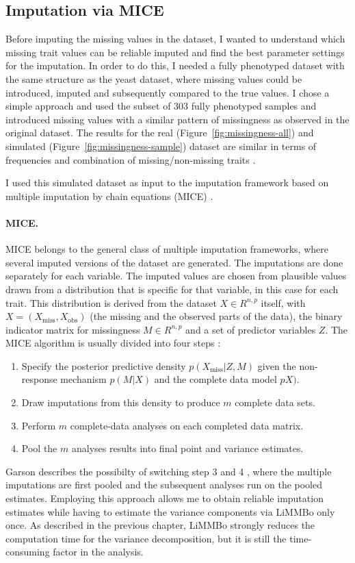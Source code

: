 \subsection{Imputation via MICE} 
Before imputing the missing values in the dataset, I wanted to understand which missing trait values can be reliable imputed and find the best parameter settings for the imputation. In order to do this, I needed a fully phenotyped dataset with the same structure as the yeast dataset, where missing values could be introduced, imputed and subsequently compared to the true values. I chose a simple approach and used the subset of 303 fully phenotyped samples and introduced missing values with a similar pattern of missingness as observed in the original dataset. The results for the real (Figure~\ref{fig:missingness-all}) and simulated (Figure~\ref{fig:missingness-sample}) dataset are similar in terms of frequencies and combination of missing/non-missing traits .

I used this simulated dataset as input to the imputation framework based on multiple imputation by chain equations (MICE) \citep{vanBuuren2011}. 
\paragraph{MICE.} MICE belongs to the general class of multiple imputation frameworks, where several imputed versions of the dataset are generated. The imputations are done separately for each variable. The imputed values are chosen from plausible values drawn from a distribution that is specific for that variable, in this case for each trait. This distribution is derived from the dataset \(X \in R^{n,p}\) itself,  with \(X = (X_\text{miss}, X_\text{obs})\) (the missing and the observed parts of the data), the binary indicator matrix for missingness \(M \in R^{n,p}\) and a set of predictor variables \(Z\). The MICE algorithm is usually divided into four steps \citep{Rubin1978,vanBuuren1999,Pigott2001,}:
\begin{enumerate}
\item Specify the posterior predictive density \(p(X_\text{miss} | Z, M)\) given the non-response mechanism  \(p(M | X)\)  and the complete data model  \(p X)\).
\item Draw imputations from this density to produce \(m\) complete data sets. 
\item Perform \(m\) complete-data analyses on each completed data matrix. 
\item Pool the \(m\) analyses results into final point and variance estimates.
\end{enumerate}
Garson describes the possibilty of switching step 3 and 4 \citeyear{Garson2015}, where the multiple imputations are first pooled and the subsequent analyses run on the pooled estimates. Employing this approach allows me to  obtain reliable imputation estimates while having to estimate the variance components via LiMMBo only once. As described in the previous chapter, LiMMBo strongly reduces the computation time for the variance decomposition, but it is still the time-consuming factor in the analysis. 

